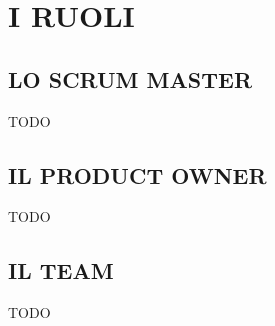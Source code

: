 \newpage
\section*{I RUOLI}
\label{sec:roles}

\subsection*{LO SCRUM MASTER}
\label{sec:scrummaster}
TODO

\subsection*{IL PRODUCT OWNER}
\label{sec:productowner}
TODO

\subsection*{IL TEAM}
\label{sec:team}
TODO